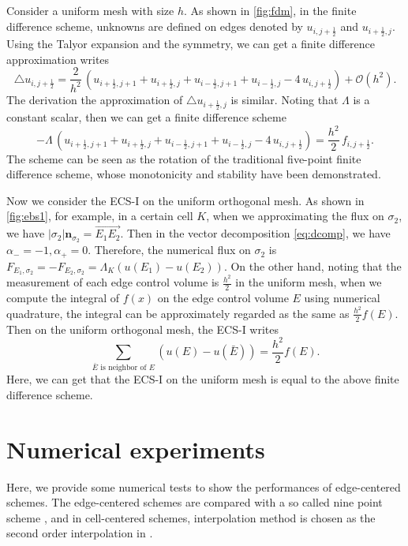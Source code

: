 \documentclass[times,review,preprint]{elsarticle}
\newcommand{\bn}{\bm{n}}
\begin{document}
Consider a uniform mesh with size $h$. As shown in \cref{fig:fdm}, in the finite difference scheme, unknowns are defined on edges denoted by $u_{i,j+\frac12}$ and $u_{i+\frac12,j}$. Using the Talyor expansion and the symmetry, we can get a finite difference approximation writes
\begin{equation*}
\triangle u_{i,j+\frac12} = \frac{2}{h^2} \, (u_{i+\frac12,j+1} + u_{i+\frac12,j} + u_{i-\frac12,j+1} + u_{i-\frac12,j} - 4 \, u_{i,j+\frac12} ) + \mathcal{O}(h^2).
\end{equation*}
The derivation the approximation of $\triangle u_{i+\frac12,j}$ is similar. Noting that $\Lambda$ is a constant scalar, then we can get a finite difference scheme
\begin{equation}\label{eq:fdm}
-\Lambda \, (u_{i+\frac12,j+1} + u_{i+\frac12,j} + u_{i-\frac12,j+1} + u_{i-\frac12,j} - 4 \, u_{i,j+\frac12}) = \frac{h^2}{2} \, f_{i,j+\frac12}.
\end{equation}
The scheme can be seen as the rotation of the traditional five-point finite difference scheme, whose monotonicity and stability have been demonstrated.

Now we consider the ECS-I on the uniform orthogonal mesh. As shown in \cref{fig:ebs1}, for example, in a certain cell $K$, when we approximating the flux on $\sigma_2$, we have $|\sigma_{2}| \bn_{\sigma_{2}} = \overrightarrow{E_1 E_2}$. Then in the vector decomposition \cref{eq:dcomp}, we have $\alpha_{-} = -1, \alpha_{+} = 0$. Therefore, the numerical flux on $\sigma_2$ is $F_{E_1, \sigma_2} = -F_{E_2, \sigma_2} = \Lambda_K (u(E_1) - u(E_2))$. On the other hand, noting that the measurement of each edge control volume is $\frac{h^2}{2}$ in the uniform mesh, when we compute the integral of $f(x)$ on the edge control volume $E$ using numerical quadrature, the integral can be approximately regarded as the same as $\frac{h^2}{2} f(E)$. Then on the uniform orthogonal mesh, the ECS-I writes
\begin{equation*}
\sum_{\bar{E} \text{ is neighbor of } E} (u(E) - u(\bar{E})) = \frac{h^2}{2} f(E).
\end{equation*}
Here, we can get that the ECS-I on the uniform mesh is equal to the above finite difference scheme.

\section{Numerical experiments}\label{sec5}

Here, we provide some numerical tests to show the performances of edge-centered schemes. The edge-centered schemes are compared with a so called nine point scheme \cite{li1980}, and in cell-centered schemes, interpolation method is chosen as the second order interpolation in \cite{Chatzipantelidis1999}.
\end{document}
